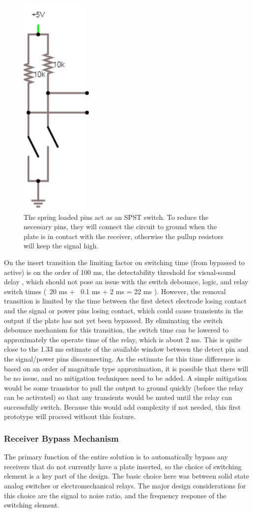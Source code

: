 \documentclass{article}
\begin{document}
		\begin{figure}
			\centering
			\includegraphics[width = 0.1 \textwidth]{PR2Images/PlateDetectSwitch}
			\caption{The spring loaded pins act as an SPST switch.  To reduce the necessary pins, they will connect the circuit to ground when the plate is in contact with the receiver, otherwise the pullup resistors will keep the signal high.}
			\label{fig:PlateDetectSwitch}
		\end{figure}

		On the insert transition the limiting factor on switching time (from bypassed to active) is on the order of 100 ms, the detectability threshold for visual-sound delay \cite{Timing}, which should not pose an issue with the switch debounce, logic, and relay switch times (~20 ms + ~0.1 ms + 2 ms = 22 ms \cite{EA2datasheet}).  However, the removal transition is limited by the time between the first detect electrode losing contact and the signal or power pins losing contact, which could cause transients in the output if the plate has not yet been bypassed.  By eliminating the switch debounce mechanism for this transition, the switch time can be lowered to approximately the operate time of the relay, which is about 2 ms.  This is quite close to the 1.33 ms estimate of the available window between the detect pin and the signal/power pins disconnecting.  As the estimate for this time difference is based on an order of magnitude type approximation, it is possible that there will be no issue, and no mitigation techniques need to be added.  A simple mitigation would be some transistor to pull the output to ground quickly (before the relay can be activated) so that any transients would be muted until the relay can successfully switch.  Because this would add complexity if not needed, this first prototype will proceed without this feature.

		\subsubsection{Receiver Bypass Mechanism}
		The primary function of the entire solution is to automatically bypass any receivers that do not currently have a plate inserted, so the choice of switching element is a key part of the design.  The basic choice here was between solid state analog switches or electromechanical relays.  The major design considerations for this choice are the signal to noise ratio, and the frequency response of the switching element.
\end{document}
